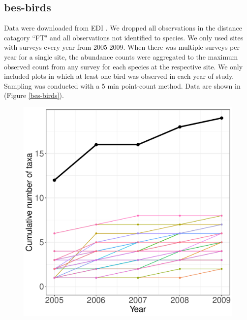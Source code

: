 \documentclass[11pt, oneside]{article}
\begin{document}
\subsection{bes-birds}
Data were downloaded from EDI \citep{bes-birds}. We dropped all observations in the distance catagory ``FT" and all observations not identified to species. 
We only used sites with surveys every year from 2005-2009. 
When there was multiple surveys per year for a single site, the abundance counts were aggregated to the maximum observed count from any survey for each species at the respective site.
We only included plots in which at least one bird was observed in each year of study.
Sampling was conducted with a 5 min point-count method.
Data are shown in (Figure \ref{bes-birds}).
\begin{figure}[h!]
\centering
\includegraphics[scale = 0.4]{bes-birds-nilon_species_accumulation_curve.pdf}

\end{figure}
\end{document}
